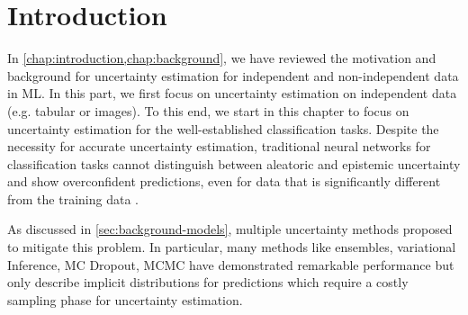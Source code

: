 \section{Introduction}
\label{sec:introduction_006}

In \cref{chap:introduction,chap:background}, we have reviewed the motivation and background for uncertainty estimation for independent and non-independent data in ML. In this part, we first focus on uncertainty estimation on independent data (e.g. tabular or images). To this end, we start in this chapter to focus on uncertainty estimation for the well-established classification tasks. Despite the necessity for accurate uncertainty estimation, traditional neural networks for classification tasks cannot distinguish between aleatoric and epistemic uncertainty and show overconfident predictions, even for data that is significantly different from the training data \cite{ensembles} \cite{calibration-network}.

As discussed in \cref{sec:background-models}, multiple uncertainty methods proposed to mitigate this problem. In particular, many methods like ensembles, variational Inference, MC Dropout, MCMC have demonstrated remarkable performance but only describe implicit distributions for predictions which require a costly sampling phase for uncertainty estimation.




